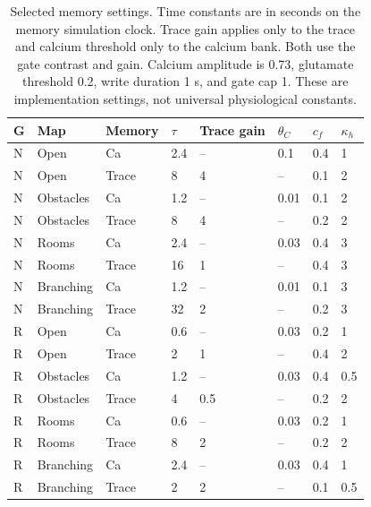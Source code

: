 \begin{table}[htbp]\centering\footnotesize
\setlength{\tabcolsep}{3.5pt}
\caption{Selected memory settings. Time constants are in seconds on the memory simulation clock. Trace gain applies only to the trace and calcium threshold only to the calcium bank. Both use the gate contrast and gain. Calcium amplitude is 0.73, glutamate threshold 0.2, write duration 1 s, and gate cap 1. These are implementation settings, not universal physiological constants.}\label{tab:memory_settings}
\begin{tabular}{@{}llllllll@{}}\toprule
G & Map & Memory & $\tau$ & Trace gain & $\theta_C$ & $c_f$ & $\kappa_h$\\\midrule
N & Open & Ca & 2.4 & -- & 0.1 & 0.4 & 1\\
N & Open & Trace & 8 & 4 & -- & 0.1 & 2\\
N & Obstacles & Ca & 1.2 & -- & 0.01 & 0.1 & 2\\
N & Obstacles & Trace & 8 & 4 & -- & 0.2 & 2\\
N & Rooms & Ca & 2.4 & -- & 0.03 & 0.4 & 3\\
N & Rooms & Trace & 16 & 1 & -- & 0.4 & 3\\
N & Branching & Ca & 1.2 & -- & 0.01 & 0.1 & 3\\
N & Branching & Trace & 32 & 2 & -- & 0.2 & 3\\
R & Open & Ca & 0.6 & -- & 0.03 & 0.2 & 1\\
R & Open & Trace & 2 & 1 & -- & 0.4 & 2\\
R & Obstacles & Ca & 1.2 & -- & 0.03 & 0.4 & 0.5\\
R & Obstacles & Trace & 4 & 0.5 & -- & 0.2 & 2\\
R & Rooms & Ca & 0.6 & -- & 0.03 & 0.2 & 1\\
R & Rooms & Trace & 8 & 2 & -- & 0.2 & 2\\
R & Branching & Ca & 2.4 & -- & 0.03 & 0.4 & 1\\
R & Branching & Trace & 2 & 2 & -- & 0.1 & 0.5\\
\bottomrule\end{tabular}
\end{table}
